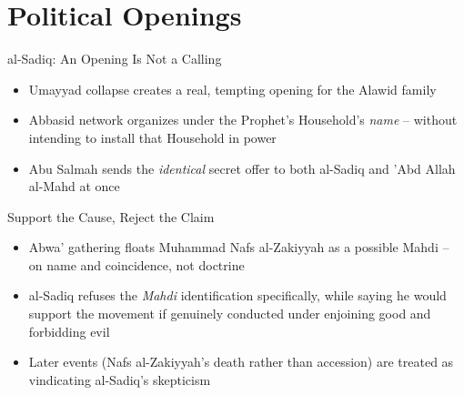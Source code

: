 \section{Political Openings}

\begin{frame}{al-Sadiq: An Opening Is Not a Calling}
\begin{itemize}[itemsep=5pt]
  \item Umayyad collapse creates a real, tempting opening for the Alawid family
  \item Abbasid network organizes under the Prophet's Household's \emph{name} -- without intending to install that Household in power
  \item Abu Salmah sends the \emph{identical} secret offer to both al-Sadiq and 'Abd Allah al-Mahd at once
\end{itemize}
\end{frame}

\begin{frame}{Support the Cause, Reject the Claim}
\begin{itemize}[itemsep=5pt]
  \item Abwa' gathering floats Muhammad Nafs al-Zakiyyah as a possible Mahdi -- on name and coincidence, not doctrine
  \item al-Sadiq refuses the \emph{Mahdi} identification specifically, while saying he would support the movement if genuinely conducted under enjoining good and forbidding evil
  \item Later events (Nafs al-Zakiyyah's death rather than accession) are treated as vindicating al-Sadiq's skepticism
\end{itemize}
\end{frame}

